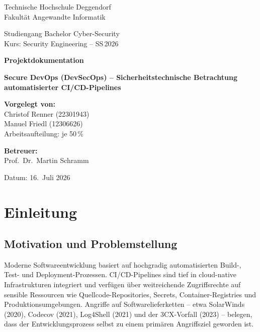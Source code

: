 \documentclass[12pt, a4paper]{scrartcl}
\newcommand{\faculty}{Fakultät Angewandte Informatik}
\newcommand{\studies}{Bachelor Cyber-Security}
\newcommand{\coursetitle}{Security Engineering}
\newcommand{\semester}{SS\,2026}
\newcommand{\projecttitle}{Secure DevOps (DevSecOps) -- Sicherheitstechnische Betrachtung automatisierter CI/CD-Pipelines}
\newcommand{\supervisor}{Prof.\ Dr.\ Martin Schramm}
\newcommand{\studentA}{Christof Renner (22301943)}
\newcommand{\studentB}{Manuel Friedl (12306626)}
\newcommand{\submissiondate}{16.\ Juli 2026}
\begin{document}
\begin{titlepage}
  \centering
  \vspace*{1cm}
  {\LARGE Technische Hochschule Deggendorf\\[0.2cm]
   \large \faculty\par}
  \vspace{0.4cm}
  {\Large Studiengang \studies\\[0.3cm]
   Kurs: \coursetitle{} -- \semester\par}
  \vspace{2.5cm}
  {\huge\bfseries\color{thblue} Projektdokumentation\par}
  \vspace{1.5cm}
  {\LARGE\bfseries \projecttitle\par}
  \vfill
  \begin{minipage}[t]{0.48\textwidth}
    \textbf{Vorgelegt von:}\\[6pt]
    \studentA\\
    \studentB\\[8pt]
    {\small Arbeitsaufteilung: je 50\,\%}
  \end{minipage}\hfill
  \begin{minipage}[t]{0.48\textwidth}\raggedleft
    \textbf{Betreuer:}\\[6pt]
    \supervisor
  \end{minipage}
  \vspace{1.5cm}

  Datum: \submissiondate
\end{titlepage}

\tableofcontents
\newpage

\section{Einleitung}

\subsection{Motivation und Problemstellung}
Moderne Softwareentwicklung basiert auf hochgradig automatisierten Build-, Test- und
Deployment-Prozessen. CI/CD-Pipelines sind tief in cloud-native Infrastrukturen
integriert und verfügen über weitreichende Zugriffsrechte auf sensible Ressourcen
wie Quellcode-Repositories, Secrets, Container-Registries und Produktionsumgebungen.
Angriffe auf Softwarelieferketten -- etwa SolarWinds (2020), Codecov (2021),
\mbox{Log4Shell} (2021) und der 3CX-Vorfall (2023) -- belegen, dass der
Entwicklungsprozess selbst zu einem primären Angriffsziel geworden ist.
\end{document}
